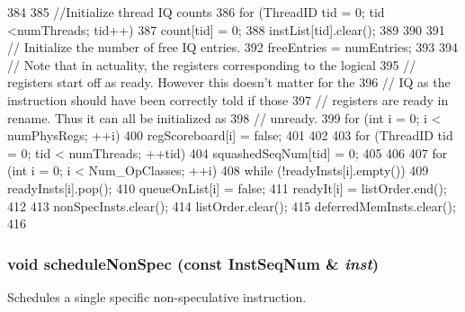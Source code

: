 \begin{DoxyCode}
384 {
385     //Initialize thread IQ counts
386     for (ThreadID tid = 0; tid <numThreads; tid++) {
387         count[tid] = 0;
388         instList[tid].clear();
389     }
390 
391     // Initialize the number of free IQ entries.
392     freeEntries = numEntries;
393 
394     // Note that in actuality, the registers corresponding to the logical
395     // registers start off as ready.  However this doesn't matter for the
396     // IQ as the instruction should have been correctly told if those
397     // registers are ready in rename.  Thus it can all be initialized as
398     // unready.
399     for (int i = 0; i < numPhysRegs; ++i) {
400         regScoreboard[i] = false;
401     }
402 
403     for (ThreadID tid = 0; tid < numThreads; ++tid) {
404         squashedSeqNum[tid] = 0;
405     }
406 
407     for (int i = 0; i < Num_OpClasses; ++i) {
408         while (!readyInsts[i].empty())
409             readyInsts[i].pop();
410         queueOnList[i] = false;
411         readyIt[i] = listOrder.end();
412     }
413     nonSpecInsts.clear();
414     listOrder.clear();
415     deferredMemInsts.clear();
416 }
\end{DoxyCode}
\hypertarget{classInstructionQueue_a15ca5aaeab5bd4c2169ed41bbc7fb79c}{
\subsubsection[{scheduleNonSpec}]{\setlength{\rightskip}{0pt plus 5cm}void scheduleNonSpec (const {\bf InstSeqNum} \& {\em inst})}}
\label{classInstructionQueue_a15ca5aaeab5bd4c2169ed41bbc7fb79c}
Schedules a single specific non-\/speculative instruction. 


